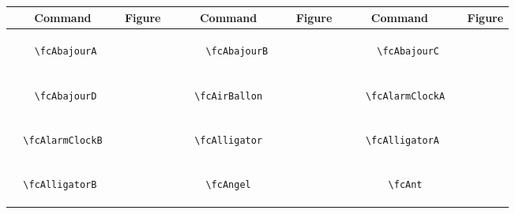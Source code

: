 \documentclass[x11names]{article}
\begin{document}
	
\begin{table}[H]\centering\begin{tabular}{|c|c|c|c|c|c|}\hline{\bf Command} & {\bf Figure} & {\bf Command} & {\bf Figure} & {\bf Command} & {\bf Figure}\\	\hline	&\multirow{5}{*}{	\fcAbajourA	[scale=0.16]} & &\multirow{5}{*}{	\fcAbajourB	[scale=0.16]} & &\multirow{5}{*}{	\fcAbajourC	[scale=0.16]}\\	& & & & & \\	& & & & & \\	\verb|	\fcAbajourA	| & & \verb|	\fcAbajourB	| & & \verb|	\fcAbajourC	| & \\	& & & & & \\	& & & & & \\	& & & & & \\	\hline									
		&\multirow{5}{*}{	\fcAbajourD	[scale=0.16]} & &\multirow{5}{*}{	\fcAirBallon	[scale=0.16]} & &\multirow{5}{*}{	\fcAlarmClockA	[scale=0.16]}\\	& & & & & \\	& & & & & \\	\verb|	\fcAbajourD	| & & \verb|	\fcAirBallon	| & & \verb|	\fcAlarmClockA	| & \\	& & & & & \\	& & & & & \\	& & & & & \\	\hline									
		&\multirow{5}{*}{	\fcAlarmClockB	[scale=0.16]} & &\multirow{5}{*}{	\fcAlligator	[scale=0.64]} & &\multirow{5}{*}{	\fcAlligatorA	[scale=0.16]}\\	& & & & & \\	& & & & & \\	\verb|	\fcAlarmClockB	| & & \verb|	\fcAlligator	| & & \verb|	\fcAlligatorA	| & \\	& & & & & \\	& & & & & \\	& & & & & \\	\hline									
		&\multirow{5}{*}{	\fcAlligatorB	[scale=0.16]} & &\multirow{5}{*}{	\fcAngel	[scale=0.09]} & &\multirow{5}{*}{	\fcAnt	[scale=0.64]}\\	& & & & & \\	& & & & & \\	\verb|	\fcAlligatorB	| & & \verb|	\fcAngel	| & & \verb|	\fcAnt	| & \\	& & & & & \\	& & & & & \\	& & & & & \\	\hline									

\end{tabular}
\end{table}
\end{document}
